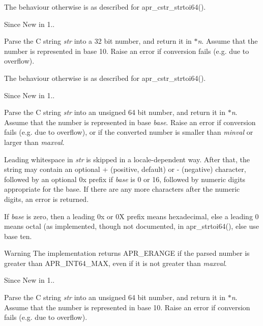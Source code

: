 The behaviour otherwise is as described for apr\+\_\+cstr\+\_\+strtoi64().

\begin{DoxySince}{Since}
New in 1..
\end{DoxySince}
Parse the C string {\itshape str} into a 32 bit number, and return it in {\itshape $\ast$n}. Assume that the number is represented in base 10. Raise an error if conversion fails (e.\+g. due to overflow).

The behaviour otherwise is as described for apr\+\_\+cstr\+\_\+strtoi64().

\begin{DoxySince}{Since}
New in 1..
\end{DoxySince}
Parse the C string {\itshape str} into an unsigned 64 bit number, and return it in {\itshape $\ast$n}. Assume that the number is represented in base {\itshape base}. Raise an error if conversion fails (e.\+g. due to overflow), or if the converted number is smaller than {\itshape minval} or larger than {\itshape maxval}.

Leading whitespace in {\itshape str} is skipped in a locale-\/dependent way. After that, the string may contain an optional \textquotesingle{}+\textquotesingle{} (positive, default) or \textquotesingle{}-\/\textquotesingle{} (negative) character, followed by an optional \textquotesingle{}0x\textquotesingle{} prefix if {\itshape base} is 0 or 16, followed by numeric digits appropriate for the base. If there are any more characters after the numeric digits, an error is returned.

If {\itshape base} is zero, then a leading \textquotesingle{}0x\textquotesingle{} or \textquotesingle{}0X\textquotesingle{} prefix means hexadecimal, else a leading \textquotesingle{}0\textquotesingle{} means octal (as implemented, though not documented, in apr\+\_\+strtoi64(), else use base ten.

\begin{DoxyWarning}{Warning}
The implementation returns A\+P\+R\+\_\+\+E\+R\+A\+N\+GE if the parsed number is greater than A\+P\+R\+\_\+\+I\+N\+T64\+\_\+\+M\+AX, even if it is not greater than {\itshape maxval}.
\end{DoxyWarning}
\begin{DoxySince}{Since}
New in 1..
\end{DoxySince}
Parse the C string {\itshape str} into an unsigned 64 bit number, and return it in {\itshape $\ast$n}. Assume that the number is represented in base 10. Raise an error if conversion fails (e.\+g. due to overflow).

